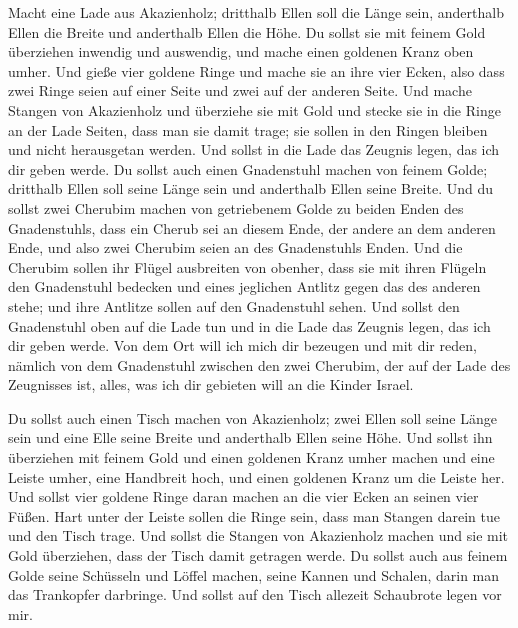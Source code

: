  Macht eine Lade aus Akazienholz; dritthalb Ellen soll die
Länge sein, anderthalb Ellen die Breite und anderthalb Ellen die Höhe.
 Du sollst sie mit feinem Gold überziehen inwendig und
auswendig, und mache einen goldenen Kranz oben umher.  Und
gieße vier goldene Ringe und mache sie an ihre vier Ecken, also dass
zwei Ringe seien auf einer Seite und zwei auf der anderen Seite.
 Und mache Stangen von Akazienholz und überziehe sie mit
Gold  und stecke sie in die Ringe an der Lade Seiten, dass
man sie damit trage;  sie sollen in den Ringen bleiben und
nicht herausgetan werden.  Und sollst in die Lade das
Zeugnis legen, das ich dir geben werde.  Du sollst auch
einen Gnadenstuhl machen von feinem Golde; dritthalb Ellen soll seine
Länge sein und anderthalb Ellen seine Breite.  Und du
sollst zwei Cherubim machen von getriebenem Golde zu beiden Enden des
Gnadenstuhls,  dass ein Cherub sei an diesem Ende, der
andere an dem anderen Ende, und also zwei Cherubim seien an des
Gnadenstuhls Enden.  Und die Cherubim sollen ihr Flügel
ausbreiten von obenher, dass sie mit ihren Flügeln den Gnadenstuhl
bedecken und eines jeglichen Antlitz gegen das des anderen stehe; und
ihre Antlitze sollen auf den Gnadenstuhl sehen.  Und sollst
den Gnadenstuhl oben auf die Lade tun und in die Lade das Zeugnis legen,
das ich dir geben werde.  Von dem Ort will ich mich dir
bezeugen und mit dir reden, nämlich von dem Gnadenstuhl zwischen den
zwei Cherubim, der auf der Lade des Zeugnisses ist, alles, was ich dir
gebieten will an die Kinder Israel.

 Du sollst auch einen Tisch machen von Akazienholz; zwei
Ellen soll seine Länge sein und eine Elle seine Breite und anderthalb
Ellen seine Höhe.  Und sollst ihn überziehen mit feinem
Gold und einen goldenen Kranz umher machen  und eine Leiste
umher, eine Handbreit hoch, und einen goldenen Kranz um die Leiste her.
 Und sollst vier goldene Ringe daran machen an die vier
Ecken an seinen vier Füßen.  Hart unter der Leiste sollen
die Ringe sein, dass man Stangen darein tue und den Tisch trage.
 Und sollst die Stangen von Akazienholz machen und sie mit
Gold überziehen, dass der Tisch damit getragen werde.  Du
sollst auch aus feinem Golde seine Schüsseln und Löffel machen, seine
Kannen und Schalen, darin man das Trankopfer darbringe. 
Und sollst auf den Tisch allezeit Schaubrote legen vor mir.

